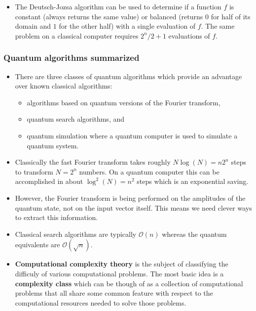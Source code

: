 \documentclass{article}
\begin{document}
\begin{itemize}
  \item The Deutsch-Jozsa algorithm can be used to determine if a function $f$ is constant (always returns the same value) or balanced (returns $0$ for half of its domain and $1$ for the other half) with a single evaluation of $f$. The same problem on a classical computer requires $2^n / 2 + 1$ evaluations of $f$.
\end{itemize}

\subsubsection{Quantum algorithms summarized}

\begin{itemize}
  \item There are three classes of quantum algorithms which provide an advantage over known classical algorithms:

        \begin{itemize}
          \item algorithms based on quantum versions of the Fourier transform,

          \item quantum search algorithms, and

          \item quantum simulation where a quantum computer is used to simulate a quantum system.
        \end{itemize}

  \item Classically the fast Fourier transform takes roughly $N \log (N) = n 2^n$ steps to transform $N = 2^n$ numbers. On a quantum computer this can be accomplished in about $\log^2 (N) = n^2$ steps which is an exponential saving.

  \item However, the Fourier transform is being performed on the amplitudes of the quantum state, not on the input vector itself. This means we need clever ways to extract this information.

  \item Classical search algorithms are typically $\mathcal{O}(n)$ whereas the quantum equivalents are $\mathcal{O}(\sqrt{n})$.

  \item \textbf{Computational complexity theory} is the subject of classifying the difficuly of various computational problems. The most basic idea is a \textbf{complexity class} which can be though of as a collection of computational problems that all share some common feature with respect to the computational resources needed to solve those problems.


\end{itemize}
\end{document}
